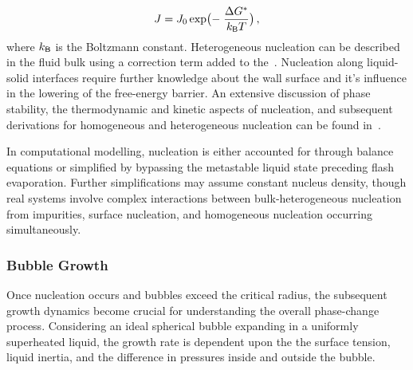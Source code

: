 \begin{equation}\label{eq:hom_nucleation}
  J = J_{0} \exp \bigl(-\;\frac{\Delta G^{\mathsf {*}}}{k_{\mathsf {B}}T}\bigr)\,,
\end{equation}
where $k_{\mathsf {B}}$ is the Boltzmann constant. Heterogeneous nucleation can be described in
 the fluid bulk using a correction term added to the~. Nucleation along 
 liquid-solid interfaces require further knowledge about the wall surface and it's
 influence in the lowering of the free-energy barrier.
 An extensive discussion of phase stability, the thermodynamic and kinetic aspects of nucleation, and 
 subsequent derivations for homogeneous and 
 heterogeneous nucleation can be found in~\cite{pinhasiModelingFlashingTwoPhase2005, carey2020}.
 
In computational modelling, nucleation is either accounted for through balance equations or 
simplified by bypassing the metastable liquid state preceding flash evaporation. Further 
simplifications may assume constant nucleus density, though real systems involve complex interactions 
between bulk-heterogeneous nucleation from impurities, surface nucleation, and homogeneous 
nucleation occurring simultaneously. 
\subsubsection*{Bubble Growth}\par\vspace{-\baselineskip}\vspace{\parskip}
Once nucleation occurs and bubbles exceed the critical radius, the subsequent growth dynamics 
become crucial for understanding the overall phase-change 
process. Considering an ideal spherical bubble expanding in a uniformly superheated liquid, 
the growth rate is dependent upon the the surface tension, liquid inertia, and the difference in pressures inside
and outside the bubble. 

